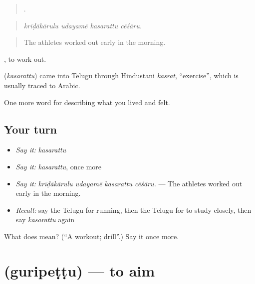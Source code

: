 \begin{quote}
   .
\end{quote}

\begin{quote}
\emph{krīḍākārulu udayamē kasarattu cēśāru.}
\end{quote}

\begin{quote}
The athletes worked out early in the morning.
\end{quote}

 , to work out.

\begin{cousinweb}
\textbf{} (\emph{kasarattu}) came into Telugu through Hindustani \emph{kasrat}, \textquotedblleft{}exercise\textquotedblright{}, which is usually traced to Arabic.
\end{cousinweb}

\begin{grammarlens}[title={What you've built}]
One more word for describing what you lived and felt.
\end{grammarlens}

\subsection*{Your turn}
\begin{itemize}
\raggedright
  \item \emph{Say it:} \emph{kasarattu}
  \item \emph{Say it:} \emph{kasarattu}, once more
  \item \emph{Say it:} \emph{krīḍākārulu udayamē kasarattu cēśāru.} — The athletes worked out early in the morning.
  \item \emph{Recall:} say the Telugu for running, then the Telugu for to study closely, then say \emph{kasarattu} again
\end{itemize}

\begin{tcolorbox}[breakable,colback=teal!4,colframe=teal!35!black,title={Before you move on}]
What does  mean? (\textquotedblleft{}A workout; drill\textquotedblright{}.) Say it once more.
\end{tcolorbox}
\section[\texorpdfstring{\te{గురిపెట్టు} (guripeṭṭu)}{గురిపెట్టు (guripeṭṭu)}]{ (guripeṭṭu) — to aim}

